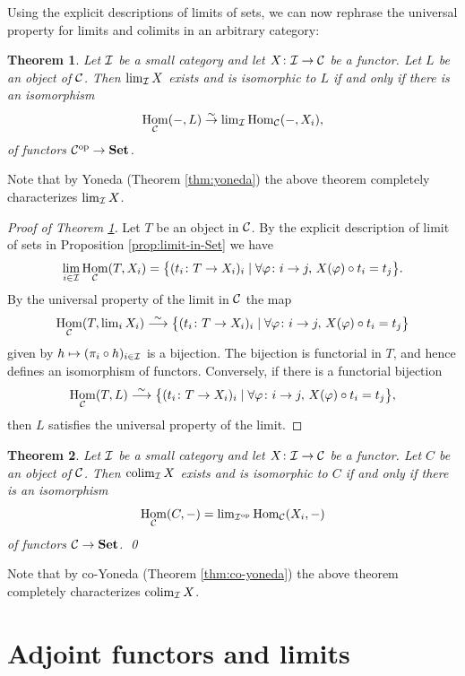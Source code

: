 \documentclass[11pt]{amsbook}
\newcommand{\isomto}{\overset{\sim}{\to}}
\newcommand{\longisomto}{\overset{\sim}{\longrightarrow}}
\DeclareMathOperator\Hom{Hom}
\DeclareMathOperator\colim{colim}
\def\opp{\mathrm{op}}
\def\Set{\mathbf{Set}}
\theoremstyle{plain}
\newtheorem{theorem}{Theorem}
\theoremstyle{definition}
\begin{document}
Using the explicit descriptions of limits  of sets, we can now rephrase the universal property for limits and colimits in an arbitrary category:

\begin{theorem}\label{thm:limit-yoneda}
Let ${\mathcal{I}}$ be a small category and let $X\colon {\mathcal{I}} \to {\mathcal{C}}$ be a functor. Let $L$ be an object of ${\mathcal{C}}$. Then $\lim_{\mathcal{I}} X$ exists and is isomorphic to $L$ if and only if there is an isomorphism
\[
	\Hom_\cC(-, L) \isomto \textstyle\lim_\cI \Hom_\cC(-,X_i),
\]
of functors $\cC^\opp \to \Set$. \end{theorem}

Note that by Yoneda (Theorem \ref{thm:yoneda})  the above theorem completely characterizes $\lim_{\mathcal{I}} X$. 

\begin{proof}[Proof of Theorem \ref{thm:limit-yoneda}]
Let $T$ be an object in ${\mathcal{C}}$. By the explicit description of limit of sets in Proposition \ref{prop:limit-in-Set}
we have
\[
	\lim_{i\in \cI} \Hom_\cC(T,X_i) = \big\{ (t_i\colon T\to X_i)_i \mid \forall \varphi \colon i \to j,\,X(\varphi) \circ t_i = t_j \big\}.
\]
By the universal property of the limit in ${\mathcal{C}}$ the map 
\[
	\Hom_\cC(T, \textstyle\lim_i X_i) \longisomto
	\big\{ (t_i\colon T\to X_i)_i \mid \forall \varphi \colon i \to j,\,X(\varphi) \circ t_i = t_j \big\}
\]
given by $h \mapsto ( \pi_i \circ h)_{i \in {\mathcal{I}}}$ is a bijection. The bijection is functorial in $T$, and hence defines an isomorphism of functors.
Conversely, if there is a functorial bijection
\[
	\Hom_\cC(T,L) \longisomto
	\big\{ (t_i\colon T\to X_i)_i \mid \forall \varphi \colon i \to j,\, X(\varphi) \circ t_i = t_j \big\},
\]
then $L$ satisfies the universal property of the limit.
\end{proof}

\begin{theorem}\label{thm:colimit-yoneda}
Let ${\mathcal{I}}$ be a small category and let $X\colon {\mathcal{I}} \to {\mathcal{C}}$ be a functor. Let $C$ be an object of ${\mathcal{C}}$. 
Then $\colim_\cI X$ exists and is isomorphic to $C$ if and only if there is an isomorphism
\[
	\Hom_\cC(C, -) = \textstyle\lim_{\cI^\opp} \Hom_\cC(X_i, -)
\]
of functors $\cC\to \Set$. \qed
\end{theorem}
Note that by co-Yoneda (Theorem \ref{thm:co-yoneda})  the above theorem completely characterizes $\colim_\cI X$. 


\section{Adjoint functors and limits}
\end{document}
